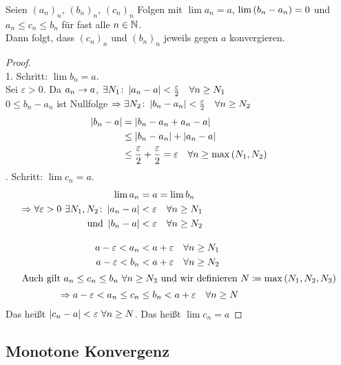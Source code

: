 \begin{satz}
    \label{satz:sandwich}
    Seien $(a_n)_n$, $(b_n)_n$, $(c_n)_n$ Folgen mit $\lim a_n = a$, $\lim \left(b_n-a_n\right) = 0$ und $a_n \leq c_n \leq b_n$ für fast alle $n\in\mathbb{N}$.\\
    Dann folgt, dass $(c_n)_n$ und $(b_n)_n$ jeweils gegen $a$ konvergieren.
    \begin{proof}
        ~\\
        1. Schritt: $\lim b_n = a$.\\[10pt]
        Sei $\varepsilon > 0$. Da $a_n\rightarrow{} a$, $\exists N_1\colon \left\lvert a_n-a\right\rvert < \frac{\varepsilon}{2}\quad\forall n\geq N_1$\\
        $0\leq b_n-a_n$ ist Nullfolge $\Rightarrow{} \exists N_2\colon \left\lvert b_n-a_n\right\rvert < \frac{\varepsilon}{2}\quad\forall n\geq N_2$\\
        \begin{align*}
            \left\lvert b_n-a\right\rvert &= \left\lvert b_n-a_n+a_n-a\right\rvert\\
            &\leq \left\lvert b_n - a_n\right\rvert + \left\lvert a_n-a\right\rvert\\
            &\leq \frac{\varepsilon}{2} + \frac{\varepsilon}{2} = \varepsilon\quad \forall n\geq \max\left(N_1, N_2\right)
        \end{align*}
        . Schritt: $\lim c_n = a$.
        \begin{align*}
            \lim a_n &= a = \lim b_n\\
            \Rightarrow{} \forall\varepsilon > 0~\exists N_1, N_2\colon \left\lvert a_n-a\right\rvert &< \varepsilon \quad\forall n\geq N_1\\
            \text{ und } \left\lvert b_n-a\right\rvert &< \varepsilon \quad\forall n\geq N_2\\[10pt]
            a-\varepsilon < a_n &< a + \varepsilon\quad\forall n\geq N_1\\
            a-\varepsilon < b_n &< a + \varepsilon\quad\forall n\geq N_2\\
            \intertext{Auch gilt $a_n \leq c_n \leq b_n~\forall n\geq N_3$ und wir definieren $N\coloneqq\max\left(N_1, N_2, N_3\right)$}
            \Rightarrow{} a-\varepsilon < a_n \leq c_n &\leq b_n < a + \varepsilon\quad\forall n\geq N
        \end{align*}
        Das heißt $\left\lvert c_n-a\right\rvert < \varepsilon~\forall n\geq N$. Das heißt $\lim c_n = a$\qedhere
    \end{proof}
\end{satz}

\subsection{Monotone Konvergenz}

